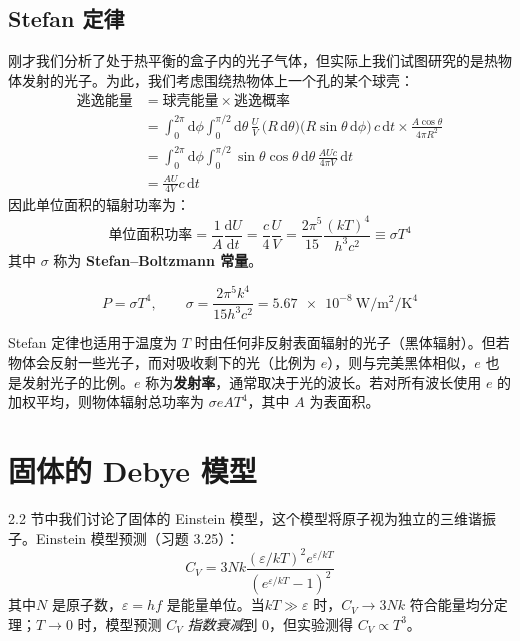 \subsection{Stefan 定律}

刚才我们分析了处于热平衡的盒子内的光子气体，但实际上我们试图研究的是热物体发射的光子。为此，我们考虑围绕热物体上一个孔的某个球壳：
\begin{equation}
    \begin{split}
        \text{逃逸能量} &= \text{球壳能量} \times \text{逃逸概率}\\
        &=\int_0^{2\pi}\mathrm{d}\phi\int_0^{\pi/2}\mathrm{d}\theta\,\frac{U}{V}\,\bigl(R\,\mathrm{d}\theta\bigr)\bigl(R\sin\theta\,\mathrm{d}\phi\bigr)\,c\,\mathrm{d}t\times \frac{A\cos\theta}{4\pi R^2}\\
        &=\int_0^{2\pi}\mathrm{d}\phi\int_0^{\pi/2}\sin\theta\cos\theta\,\mathrm{d}\theta\,\frac{AUc}{4\pi V}\,\mathrm{d}t\\
        &=\frac{AU}{4V}c\,\mathrm{d}t
    \end{split}
\end{equation}
因此单位面积的辐射功率为：
\begin{equation}
    \text{单位面积功率} = \frac{1}{A}\frac{\mathrm{d}U}{\mathrm{d}t}=\frac{c}{4}\frac{U}{V} =\frac{2\pi^5}{15}\frac{(kT)^4}{h^3c^2}\equiv\sigma T^4
\end{equation}
其中 $\sigma$ 称为 \textbf{Stefan--Boltzmann 常量}。
\begin{corollary}[Stefan 定律]
    \begin{equation}
        P = \sigma T^4,\qquad \sigma =\frac{2\pi^5k^4}{15h^3c^2}=\qty{5.67e-8}{\watt\per\metre\squared\per\kelvin\tothe{4}}
    \end{equation}
\end{corollary}

Stefan 定律也适用于温度为 $T$ 时由任何非反射表面辐射的光子（黑体辐射）。但若物体会反射一些光子，而对吸收剩下的光（比例为 $e$），则与完美黑体相似，$e$ 也是发射光子的比例。$e$ 称为\textbf{发射率}，通常取决于光的波长。若对所有波长使用 $e$ 的加权平均，则物体辐射总功率为 $\sigma eAT^4$，其中 $A$ 为表面积。

\section{固体的 Debye 模型}
2.2 节中我们讨论了固体的 Einstein 模型，这个模型将原子视为独立的三维谐振子。Einstein 模型预测（习题 3.25）：
\begin{equation}
    C_V=3Nk\frac{(\varepsilon/kT)^2e^{\varepsilon/kT}}{(e^{\varepsilon/kT}-1)^2}
\end{equation}
其中$N$ 是原子数，$\varepsilon=hf$ 是能量单位。当$kT\gg \varepsilon$ 时，$C_V\to 3Nk$ 符合能量均分定理；$T\to 0$ 时，模型预测 $C_V$ \textit{指数衰减}到 $0$，但实验测得 $C_V\propto T^3$。

